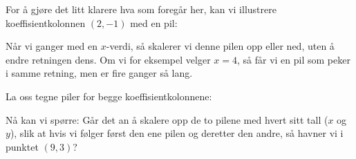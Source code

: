 For å gjøre det litt klarere hva som foregår her, kan vi illustrere
koeffisientkolonnen $(2,-1)$ med en pil:
\begin{center}
\end{center}
Når vi ganger med en $x$-verdi, så skalerer vi denne pilen opp eller
ned, uten å endre retningen dens.  Om vi for eksempel velger $x=4$, så
får vi en pil som peker i samme retning, men er fire ganger så lang.

La oss tegne piler for begge koeffisientkolonnene:
\begin{center}
\end{center}
Nå kan vi spørre: Går det an å skalere opp de to pilene med hvert sitt
tall ($x$ og~$y$), slik at hvis vi følger først den ene pilen og
deretter den andre, så havner vi i punktet $(9,3)$?

